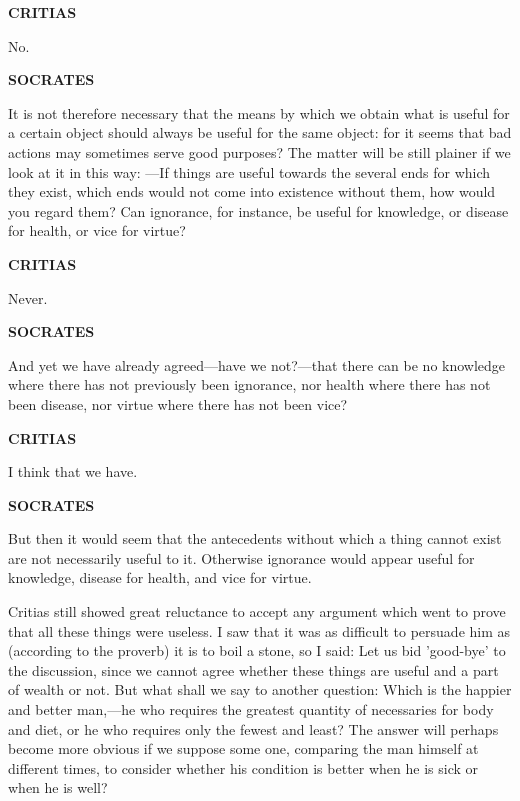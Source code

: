 \documentclass[11pt,letter]{article}
\begin{document}
\par \textbf{CRITIAS}
\par   No.

\par \textbf{SOCRATES}
\par   It is not therefore necessary that the means by which we obtain what is useful for a certain object should always be useful for the same object:  for it seems that bad actions may sometimes serve good purposes? The matter will be still plainer if we look at it in this way: —If things are useful towards the several ends for which they exist, which ends would not come into existence without them, how would you regard them? Can ignorance, for instance, be useful for knowledge, or disease for health, or vice for virtue?

\par \textbf{CRITIAS}
\par   Never.

\par \textbf{SOCRATES}
\par   And yet we have already agreed—have we not?—that there can be no knowledge where there has not previously been ignorance, nor health where there has not been disease, nor virtue where there has not been vice?

\par \textbf{CRITIAS}
\par   I think that we have.

\par \textbf{SOCRATES}
\par   But then it would seem that the antecedents without which a thing cannot exist are not necessarily useful to it. Otherwise ignorance would appear useful for knowledge, disease for health, and vice for virtue.

\par  Critias still showed great reluctance to accept any argument which went to prove that all these things were useless. I saw that it was as difficult to persuade him as (according to the proverb) it is to boil a stone, so I said: Let us bid 'good-bye' to the discussion, since we cannot agree whether these things are useful and a part of wealth or not. But what shall we say to another question: Which is the happier and better man,—he who requires the greatest quantity of necessaries for body and diet, or he who requires only the fewest and least? The answer will perhaps become more obvious if we suppose some one, comparing the man himself at different times, to consider whether his condition is better when he is sick or when he is well?
\end{document}
